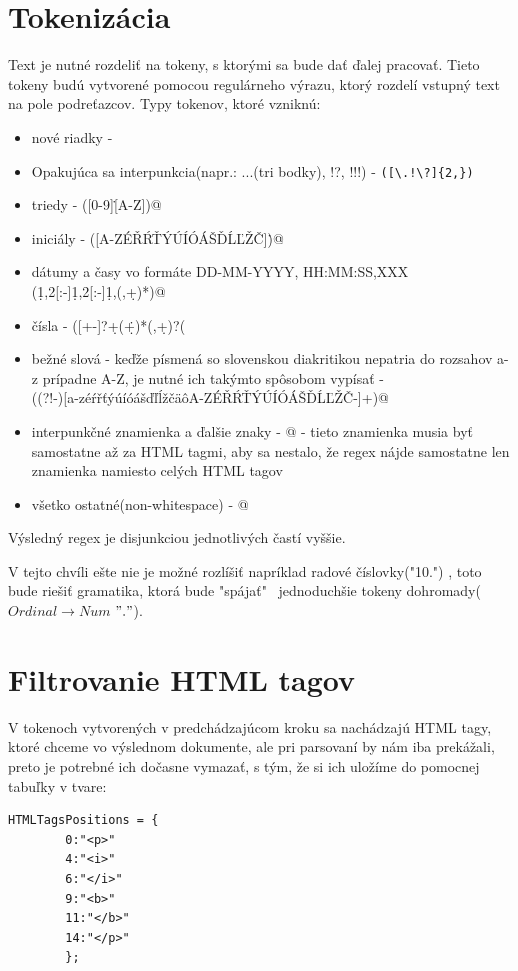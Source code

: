 \documentclass[12pt,a4paper]{report}
\theoremstyle{definition}
\theoremstyle{remark}
\begin{document}
\section{Tokenizácia}
Text je nutné rozdeliť na tokeny, s ktorými sa bude dať ďalej pracovať. Tieto tokeny budú vytvorené pomocou regulárneho výrazu, ktorý rozdelí vstupný text na pole podreťazcov.
\noindent Typy tokenov, ktoré vzniknú:
\begin{itemize}
\item nové riadky - \verb@\n@
\item Opakujúca sa interpunkcia(napr.: ...(tri bodky), !?, !!!) - \verb|([\.!\?]{2,})|
\item triedy - \verb@([0-9]\.[A-Z])@ 
\item iniciály - \verb@([A-ZÉŘŔŤÝÚÍÓÁŠĎĹĽŽČ]\.)@
\item dátumy a časy vo formáte DD-MM-YYYY, HH:MM:SS,XXX \\ \verb@(\d{1,2}[:-]\d{1,2}[:-]\d{1,}(,\d+)*)@
\item čísla - \verb@([+-]?\d+(\.\d+)*(,\d+)?(%|,-)?)@ %
\item bežné slová - keďže písmená so slovenskou diakritikou nepatria do rozsahov a-z prípadne A-Z, je nutné ich takýmto spôsobom vypísať - \\ \verb@((?!-)[a-zéŕřťýúíóášďľĺžčäôA-ZÉŘŔŤÝÚÍÓÁŠĎĹĽŽČ-]+)@
\item interpunkčné znamienka a ďalšie znaky - @ - tieto znamienka musia byť samostatne až za HTML tagmi, aby sa nestalo, že regex nájde samostatne len znamienka namiesto celých HTML tagov
\item všetko ostatné(non-whitespace) - \verb@[\S+]@
\end{itemize}

\noindent Výsledný regex je disjunkciou jednotlivých častí vyššie.


V tejto chvíli ešte nie je možné rozlíšiť napríklad radové číslovky("10.") , toto bude riešiť gramatika, ktorá bude "spájať" \ jednoduchšie tokeny dohromady($Ordinal \to Num $ $"."$).

\section{Filtrovanie HTML tagov}
V tokenoch vytvorených v predchádzajúcom kroku sa nachádzajú HTML tagy, ktoré chceme vo výslednom dokumente, ale pri parsovaní by nám iba prekážali, preto je potrebné ich dočasne vymazať, s tým, že si ich uložíme do pomocnej tabuľky v tvare:\\
\begin{lstlisting}[caption={Tabuľka HTML tagov}, style=htmlcssjs]
HTMLTagsPositions = {
		0:"<p>"
		4:"<i>"
		6:"</i>"
		9:"<b>"
		11:"</b>"
		14:"</p>"
		};
\end{lstlisting}
\end{document}
